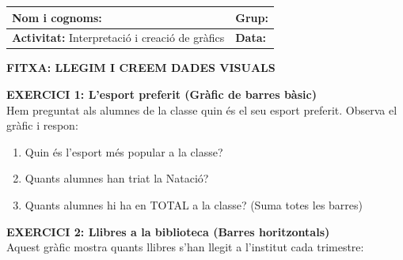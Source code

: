 \documentclass[12pt,a4paper]{article}
\begin{document}
\begingroup
\renewcommand{\arraystretch}{2.2}
\begin{tabularx}{\textwidth}{|X|p{4cm}|}
    \hline
    \textbf{Nom i cognoms:} & \textbf{Grup:} \\ \hline
    \textbf{Activitat:} Interpretació i creació de gràfics & \textbf{Data:} \\ \hline
\end{tabularx}
\endgroup

\vspace{0.4cm}

\begin{center}
    {\Large \textbf{FITXA: LLEGIM I CREEM DADES VISUALS}}
\end{center}
\vspace{0.2cm}

\noindent \textbf{EXERCICI 1: L'esport preferit (Gràfic de barres bàsic)} \\
Hem preguntat als alumnes de la classe quin és el seu esport preferit. Observa el gràfic i respon:

\begin{center}
\end{center}

\begin{enumerate}[label=\alph*)]
    \item Quin és l'esport més popular a la classe?
    \vspace{0.6cm}
    \item Quants alumnes han triat la Natació?
    \vspace{0.6cm}
    \item Quants alumnes hi ha en TOTAL a la classe? (Suma totes les barres)
    \vspace{0.6cm}
\end{enumerate}

\noindent \textbf{EXERCICI 2: Llibres a la biblioteca (Barres horitzontals)} \\
Aquest gràfic mostra quants llibres s'han llegit a l'institut cada trimestre:
\end{document}
